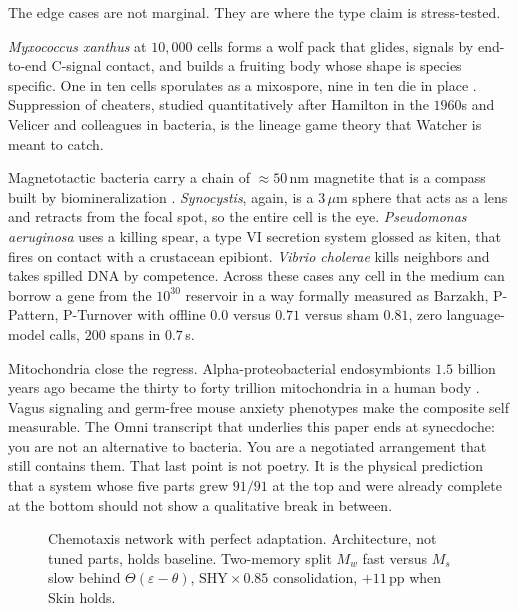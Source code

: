 \documentclass[12pt,a4paper]{article}
\begin{document}
The edge cases are not marginal. They are where the type claim is stress-tested.

\emph{Myxococcus xanthus} at $10{,}000$ cells forms a wolf pack that glides, signals by end-to-end C-signal contact, and builds a fruiting body whose shape is species specific. One in ten cells sporulates as a mixospore, nine in ten die in place \cite{velicer2009}. Suppression of cheaters, studied quantitatively after Hamilton in the $1960$s and Velicer and colleagues in bacteria, is the lineage game theory that Watcher is meant to catch.

Magnetotactic bacteria carry a chain of $\approx 50$\,nm magnetite that is a compass built by biomineralization \cite{blakemore1975}. \emph{Synocystis}, again, is a $3\,\mu\mathrm{m}$ sphere that acts as a lens and retracts from the focal spot, so the entire cell is the eye. \emph{Pseudomonas aeruginosa} uses a killing spear, a type VI secretion system glossed as kiten, that fires on contact with a crustacean epibiont. \emph{Vibrio cholerae} kills neighbors and takes spilled DNA by competence. Across these cases any cell in the medium can borrow a gene from the $10^{30}$ reservoir in a way formally measured as Barzakh, P-Pattern, P-Turnover with offline $0.0$ versus $0.71$ versus sham $0.81$, zero language-model calls, $200$ spans in $0.7$\,s.

Mitochondria close the regress. Alpha-proteobacterial endosymbionts $1.5$ billion years ago became the thirty to forty trillion mitochondria in a human body \cite{margulis1970,sagan1967}. Vagus signaling and germ-free mouse anxiety phenotypes make the composite self measurable. The Omni transcript that underlies this paper ends at synecdoche: you are not an alternative to bacteria. You are a negotiated arrangement that still contains them. That last point is not poetry. It is the physical prediction that a system whose five parts grew $91/91$ at the top and were already complete at the bottom should not show a qualitative break in between.

\begin{figure}[H]
\centering
{}
\caption{Chemotaxis network with perfect adaptation. Architecture, not tuned parts, holds baseline. Two-memory split $M_w$ fast versus $M_s$ slow behind $\Theta(\varepsilon-\theta)$, $\mathrm{SHY}\times0.85$ consolidation, $+11$\,pp when Skin holds.}
\label{fig:che}
\end{figure}
\end{document}
